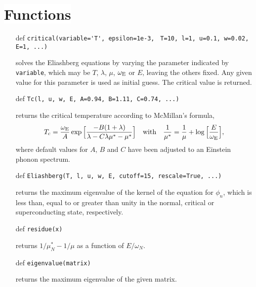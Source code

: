 \documentclass[a4paper]{article}
\def\sub#1{\sb{\mathrm{#1}}}
\def\headline#1{\section*{\normalsize\normalfont%
   \rlap{\rule[0.5ex]{\textwidth}{0.4pt}}\qquad\colorbox{white}{#1}}}
\begin{document}
   \headline{Functions}

   \begin{itemize}
      \item[def]
         \verb|critical(variable='T', epsilon=1e-3,|
         \verb| T=10, l=1, u=0.1, w=0.02, E=1, ...)|

      solves the Eliashberg equations by varying the parameter indicated by
      \verb|variable|, which may be $T$, $\lambda$, $\mu$, $\omega \sub E$ or
      $E$, leaving the others fixed. Any given value for this parameter is used
      as initial guess. The critical value is returned.

      \item[def] \verb|Tc(l, u, w, E, A=0.94, B=1.11, C=0.74, ...)|

      returns the critical temperature according to McMillan's formula,
      \begin{equation*}
         T \sub c = \frac {\omega \sub E} A \exp
         \Big[ \frac{-B (1 + \lambda)}{\lambda - C \lambda \mu^* - \mu^*} \Big]
         \quad \text{with} \quad
         \frac 1 {\mu^*} =
         \frac 1 \mu + \log \Big[ \frac E {\omega \sub E} \Big],
      \end{equation*}
      where default values for $A$, $B$ and $C$ have been adjusted to an
      Einstein phonon spectrum.

      \item[def] \verb|Eliashberg(T, l, u, w, E, cutoff=15, rescale=True, ...)|

      returns the maximum eigenvalue of the kernel of the equation for $\phi_n$,
      which is less than, equal to or greater than unity in the normal, critical
      or superconducting state, respectively.

      \item[def] \verb|residue(x)|

      returns $1 / \mu^*_N - 1 / \mu$ as a function of $E / \omega_N$.

      \item[def] \verb|eigenvalue(matrix)|

      returns the maximum eigenvalue of the given matrix.
   \end{itemize}
\end{document}
